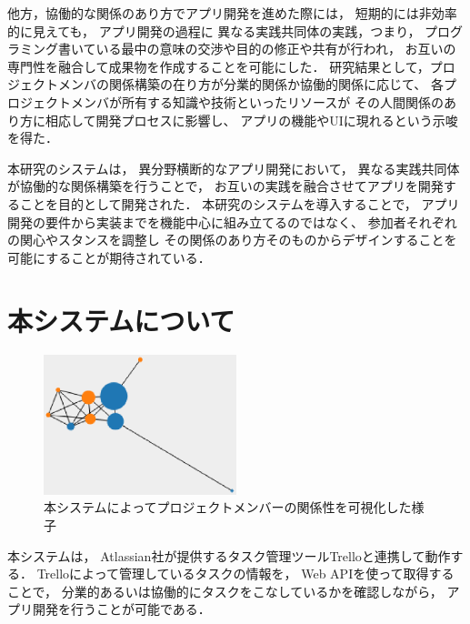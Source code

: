 \documentclass[submit,techrep]{ipsj}
\begin{document}
他方，協働的な関係のあり方でアプリ開発を進めた際には，
短期的には非効率的に見えても，
アプリ開発の過程に
異なる実践共同体の実践，つまり，
プログラミング書いている最中の意味の交渉や目的の修正や共有が行われ，
お互いの専門性を融合して成果物を作成することを可能にした．
研究結果として，プロジェクトメンバの関係構築の在り方が分業的関係か協働的関係に応じて、
各プロジェクトメンバが所有する知識や技術といったリソースが
その人間関係のあり方に相応して開発プロセスに影響し、
アプリの機能やUIに現れるという示唆を得た．


本研究のシステムは，
異分野横断的なアプリ開発において，
異なる実践共同体が協働的な関係構築を行うことで，
お互いの実践を融合させてアプリを開発することを目的として開発された．
本研究のシステムを導入することで，
アプリ開発の要件から実装までを機能中心に組み立てるのではなく、
参加者それぞれの関心やスタンスを調整し
その関係のあり方そのものからデザインすることを可能にすることが期待されている．





\section{本システムについて}
\label{system-map}

\begin{figure}[h]
  \centering
  \includegraphics[width=0.5\textwidth]{img/cop-map-graph.eps}
  \caption{本システムによってプロジェクトメンバーの関係性を可視化した様子}
  \label{cop-map-graph}
\end{figure}

本システムは，
Atlassian社が提供するタスク管理ツールTrello\cite{trello}と連携して動作する．
Trelloによって管理しているタスクの情報を，
Web APIを使って取得することで，
分業的あるいは協働的にタスクをこなしているかを確認しながら，
アプリ開発を行うことが可能である．
\end{document}
